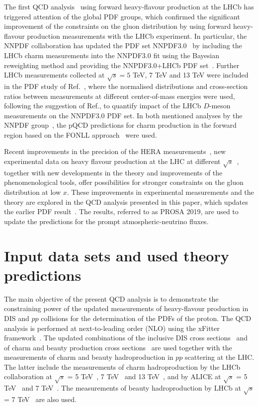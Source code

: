 {\color{blue}The first QCD analysis~\cite{Zenaiev:2015rfa} using forward heavy-flavour production at the LHCb has triggered attention of the global PDF groups, which confirmed the significant improvement of the constraints on the gluon distribution by using forward heavy-flavour production measurements with the LHCb experiment. In particular, the NNPDF collaboration has updated the PDF set NNPDF3.0~\cite{Ball:2014uwa} by including the LHCb charm measurements into the NNPDF3.0 fit using the Bayesian reweighting method and providing the NNPDF3.0+LHCb PDF set~\cite{Gauld:2015yia}. Further LHCb measurements collected at $\sqrt{s}=5$ TeV, 7 TeV and 13 TeV were included in the PDF study of Ref.~\cite{Gauld:2016kpd}, where the normalised distributions and cross-section ratios between measurements at different center-of-mass energies were used, following the suggestion of Ref.\cite{Cacciari:2015fta}, to quantify impact of the LHCb $D$-meson measurements on the NNPDF3.0 PDF set. In both mentioned analyses by the NNPDF group~\cite{Gauld:2015yia,Gauld:2016kpd}, the pQCD predictions for charm production in the forward region based on the FONLL approach~\cite{Cacciari:1993mq} were used.}


Recent improvements in the precision of the HERA measurements~\cite{Abramowicz:2015mha,H1:2018flt}, new experimental data on heavy flavour production at the LHC at 
different $\sqrt{s}$~\cite{Aaij:2015bpa,Aaij:2016jht,Acharya:2017jgo,Acharya:2019mgn}, together with new developments in the theory and improvements of the phenomenological tools, offer 
possibilities for stronger constraints on the gluon distribution at low $x$. These improvements in experimental measurements 
and the theory are explored in the QCD analysis presented in this paper, which updates the earlier PDF result~\cite{Zenaiev:2015rfa}. The results, referred to as PROSA 2019, are used to update the predictions for the prompt atmospheric-neutrino fluxes. 


\section{Input data sets and used theory predictions}
\label{sec:qcdanalysis}

The main objective of the present QCD analysis is to demonstrate the constraining power of the updated measurements of 
heavy-flavour production in DIS and $pp$ collisions for the determination of the PDFs of the proton. 
The QCD analysis is performed at next-to-leading order (NLO) using the xFitter framework~\cite{Alekhin:2014irh}. 
The updated combinations of the inclusive DIS cross sections~\cite{Abramowicz:2015mha} and of charm and beauty production cross sections~\cite{H1:2018flt} are used together with the measurements of charm and beauty hadroproduction in $pp$ scattering at the LHC. The latter include the measurements of charm hadroproduction by the LHCb collaboration at $\sqrt{s}$ = 5 TeV~\cite{Aaij:2016jht}, 7 TeV~\cite{Aaij:2013mga} and 13 TeV~\cite{Aaij:2015bpa}, and by ALICE at $\sqrt{s}$ = 5 TeV~\cite{Acharya:2019mgn} and 7 TeV~\cite{Acharya:2017jgo}. The measurements of beauty hadroproduction by LHCb at $\sqrt{s}$ = 7 TeV~\cite{Aaij:2013noa} are also used.

